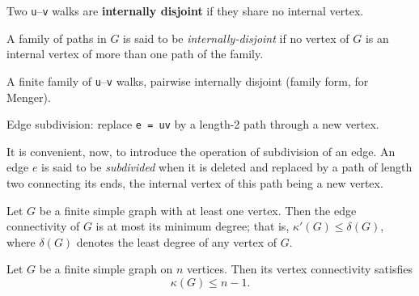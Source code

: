 \begin{definition}
\label{SimpleGraph.InternallyDisjoint}
\leanok
Two \texttt{u}--\texttt{v} walks are \textbf{internally disjoint} if they share no
internal vertex.

A family of paths in $G$ is said to be \emph{internally-disjoint} if no vertex of
$G$ is an internal vertex of more than one path of the family.
\end{definition}

\begin{definition}
\label{SimpleGraph.PairwiseInternallyDisjoint}
\leanok
A finite family of \texttt{u}--\texttt{v} walks, pairwise internally disjoint (family
form, for Menger).
\end{definition}

\begin{definition}[Edge subdivision: replace $e = uv$ by a length-2 path through a new vertex]
\label{SimpleGraph.subdivide}
\leanok
Edge subdivision: replace \texttt{e = uv} by a length-2 path through a new vertex.

It is convenient, now, to introduce the operation of subdivision of an edge. An edge $e$
is said to be \emph{subdivided} when it is deleted and replaced by a path of length two
connecting its ends, the internal vertex of this path being a new vertex.
\end{definition}

\begin{theorem}
\label{SimpleGraph.edgeConnectivity_le_minDegree}
\leanok
{}
Let $G$ be a finite simple graph with at least one vertex. Then the edge connectivity of
$G$ is at most its minimum degree; that is, $\kappa'(G) \le \delta(G)$, where
$\delta(G)$ denotes the least degree of any vertex of $G$.
\end{theorem}

\begin{theorem}
\label{SimpleGraph.vertexConnectivity_le_card_pred}
\leanok
{}
Let $G$ be a finite simple graph on $n$ vertices. Then its vertex connectivity satisfies
\[
\kappa(G) \le n - 1.
\]
\end{theorem}

